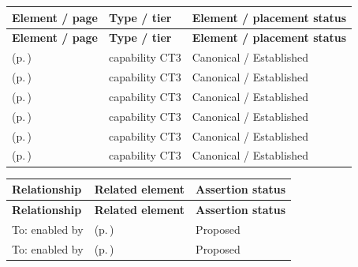 \begingroup\small\setlength{\TableWidth}{\dimexpr\linewidth-6\tabcolsep-4\arrayrulewidth\relax}
\begin{longtable}{|>{\raggedright\arraybackslash}p{0.52\TableWidth}|>{\raggedright\arraybackslash}p{0.2\TableWidth}|>{\raggedright\arraybackslash}p{0.28\TableWidth}|}
\hline\rowcolor{TableHead}\textbf{Element / page} & \textbf{Type / tier} & \textbf{Element / placement status}\\\hline\endfirsthead
\hline\rowcolor{TableHead}\textbf{Element / page} & \textbf{Type / tier} & \textbf{Element / placement status}\\\hline\endhead
\hline\endfoot
\nameref{cap:bc-clinical-knowledge-context-identification} (p.\,\pageref{cap:bc-clinical-knowledge-context-identification}) & capability CT3 & Canonical / Established\\\hline
\nameref{cap:bc-clinical-knowledge-context-extraction} (p.\,\pageref{cap:bc-clinical-knowledge-context-extraction}) & capability CT3 & Canonical / Established\\\hline
\nameref{cap:bc-clinical-knowledge-information-formulation} (p.\,\pageref{cap:bc-clinical-knowledge-information-formulation}) & capability CT3 & Canonical / Established\\\hline
\nameref{cap:bc-clinical-knowledge-concept-association} (p.\,\pageref{cap:bc-clinical-knowledge-concept-association}) & capability CT3 & Canonical / Established\\\hline
\nameref{cap:bc-clinical-knowledge-review-approval-management} (p.\,\pageref{cap:bc-clinical-knowledge-review-approval-management}) & capability CT3 & Canonical / Established\\\hline
\nameref{cap:bc-clinical-knowledge-publication-sharing} (p.\,\pageref{cap:bc-clinical-knowledge-publication-sharing}) & capability CT3 & Canonical / Established\\\hline
\end{longtable}\endgroup

\begingroup\small\setlength{\TableWidth}{\dimexpr\linewidth-6\tabcolsep-4\arrayrulewidth\relax}
\begin{longtable}{|>{\raggedright\arraybackslash}p{0.27\TableWidth}|>{\raggedright\arraybackslash}p{0.48\TableWidth}|>{\raggedright\arraybackslash}p{0.25\TableWidth}|}
\hline\rowcolor{TableHead}\textbf{Relationship} & \textbf{Related element} & \textbf{Assertion status}\\\hline\endfirsthead
\hline\rowcolor{TableHead}\textbf{Relationship} & \textbf{Related element} & \textbf{Assertion status}\\\hline\endhead
\hline\endfoot
To: enabled by & \nameref{cap:bec-clinical-knowledge-services} (p.\,\pageref{cap:bec-clinical-knowledge-services}) & Proposed\\\hline
To: enabled by & \nameref{cap:bec-governed-reference-dataset-administration} (p.\,\pageref{cap:bec-governed-reference-dataset-administration}) & Proposed\\\hline
\end{longtable}\endgroup

